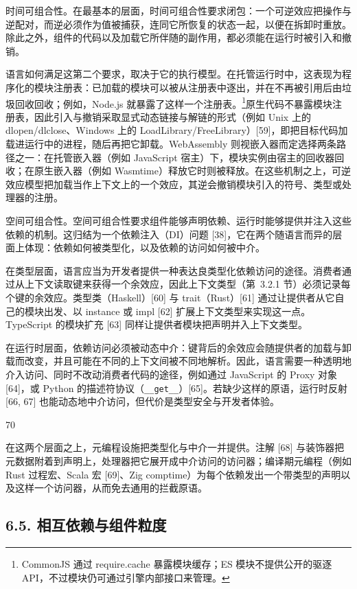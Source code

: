 时间可组合性。在最基本的层面，时间可组合性要求闭包：一个可逆效应把操作与逆配对，而逆必须作为值被捕获，连同它所恢复的状态一起，以便在拆卸时重放。除此之外，组件的代码以及加载它所伴随的副作用，都必须能在运行时被引入和撤销。

语言如何满足这第二个要求，取决于它的执行模型。在托管运行时中，这表现为程序化的模块注册表：已加载的模块可以被从注册表中逐出，并在不再被引用后由垃圾回收回收；例如，Node.js 就暴露了这样一个注册表。\footnote{CommonJS 通过 require.cache 暴露模块缓存；ES 模块不提供公开的驱逐 API，不过模块仍可通过引擎内部接口来管理。}原生代码不暴露模块注册表，因此引入与撤销采取显式动态链接与解链的形式（例如 Unix 上的 dlopen/dlclose、Windows 上的 LoadLibrary/FreeLibrary）{[}59{]}，即把目标代码加载进运行中的进程，随后再把它卸载。WebAssembly 则视嵌入器而定选择两条路径之一：在托管嵌入器（例如 JavaScript 宿主）下，模块实例由宿主的回收器回收；在原生嵌入器（例如 Wasmtime）释放它时则被释放。在这些机制之上，可逆效应模型把加载当作上下文上的一个效应，其逆会撤销模块引入的符号、类型或处理器的注册。

空间可组合性。空间可组合性要求组件能够声明依赖、运行时能够提供并注入这些依赖的机制。这归结为一个依赖注入（DI）问题 {[}38{]}，它在两个随语言而异的层面上体现：依赖如何被类型化，以及依赖的访问如何被中介。

在类型层面，语言应当为开发者提供一种表达良类型化依赖访问的途径。消费者通过从上下文读取键来获得一个余效应，因此上下文类型（第~3.2.1 节）必须记录每个键的余效应。类型类（Haskell）{[}60{]} 与 trait（Rust）{[}61{]} 通过让提供者从它自己的模块出发、以 instance 或 impl {[}62{]} 扩展上下文类型来实现这一点。TypeScript 的模块扩充 {[}63{]} 同样让提供者模块把声明并入上下文类型。

在运行时层面，依赖访问必须被动态中介：键背后的余效应会随提供者的加载与卸载而改变，并且可能在不同的上下文间被不同地解析。因此，语言需要一种透明地介入访问、同时不改动消费者代码的途径，例如通过 JavaScript 的 Proxy 对象 {[}64{]}，或 Python 的描述符协议（\texttt{\_\_get\_\_}）{[}65{]}。若缺少这样的原语，运行时反射 {[}66, 67{]} 也能动态地中介访问，但代价是类型安全与开发者体验。

70

在这两个层面之上，元编程设施把类型化与中介一并提供。注解 {[}68{]} 与装饰器把元数据附着到声明上，处理器把它展开成中介访问的访问器；编译期元编程（例如 Rust 过程宏、Scala 宏 {[}69{]}、Zig comptime）为每个依赖发出一个带类型的声明以及这样一个访问器，从而免去通用的拦截原语。

\subsection{6.5. 相互依赖与组件粒度}\label{mutual-dependencies-and-component-granularity}


